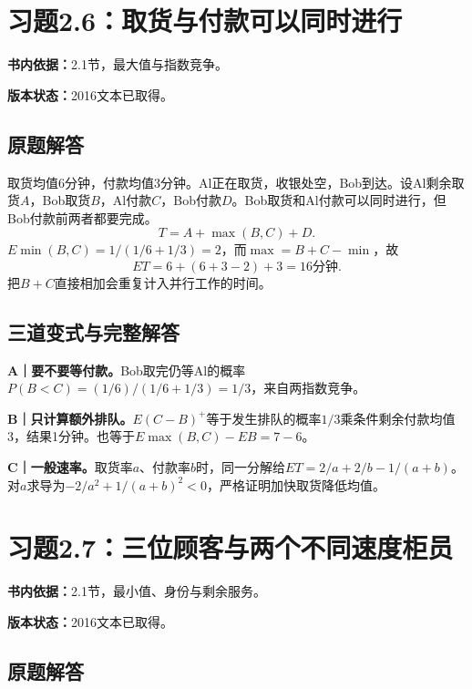 \documentclass[
  11pt,
  a4paper,
  UTF8,fontset=fandol]{ctexart}
\let\OldSection\section
\renewcommand{\section}{\Needspace{7\baselineskip}\OldSection}
\let\OldSubsection\subsection
\renewcommand{\subsection}{\Needspace{5\baselineskip}\OldSubsection}
\begin{document}
\newpage

\section{习题2.6：取货与付款可以同时进行}\label{ux4e60ux98982.6ux53d6ux8d27ux4e0eux4ed8ux6b3eux53efux4ee5ux540cux65f6ux8fdbux884c}

\textbf{书内依据：}2.1节，最大值与指数竞争。

\textbf{版本状态：}2016文本已取得。

\subsection{原题解答}\label{ux539fux9898ux89e3ux7b54-5}

取货均值6分钟，付款均值3分钟。Al正在取货，收银处空，Bob到达。设Al剩余取货\(A\)，Bob取货\(B\)，Al付款\(C\)，Bob付款\(D\)。Bob取货和Al付款可以同时进行，但Bob付款前两者都要完成。
\[T=A+\max(B,C)+D.\]
\(E\min(B,C)=1/(1/6+1/3)=2\)，而\(\max=B+C-\min\)，故
\[\boxed{ET=6+(6+3-2)+3=16\text{分钟}.}\]
把\(B+C\)直接相加会重复计入并行工作的时间。

\subsection{三道变式与完整解答}\label{ux4e09ux9053ux53d8ux5f0fux4e0eux5b8cux6574ux89e3ux7b54-5}

\textbf{A｜要不要等付款。}Bob取完仍等Al的概率\(P(B<C)=(1/6)/(1/6+1/3)=1/3\)，来自两指数竞争。

\textbf{B｜只计算额外排队。}\(E(C-B)^+\)等于发生排队的概率\(1/3\)乘条件剩余付款均值3，结果1分钟。也等于\(E\max(B,C)-EB=7-6\)。

\textbf{C｜一般速率。}取货率\(a\)、付款率\(b\)时，同一分解给\(ET=2/a+2/b-1/(a+b)\)。对\(a\)求导为\(-2/a^2+1/(a+b)^2<0\)，严格证明加快取货降低均值。

\newpage

\section{习题2.7：三位顾客与两个不同速度柜员}\label{ux4e60ux98982.7ux4e09ux4f4dux987eux5ba2ux4e0eux4e24ux4e2aux4e0dux540cux901fux5ea6ux67dcux5458}

\textbf{书内依据：}2.1节，最小值、身份与剩余服务。

\textbf{版本状态：}2016文本已取得。

\subsection{原题解答}\label{ux539fux9898ux89e3ux7b54-6}
\end{document}
